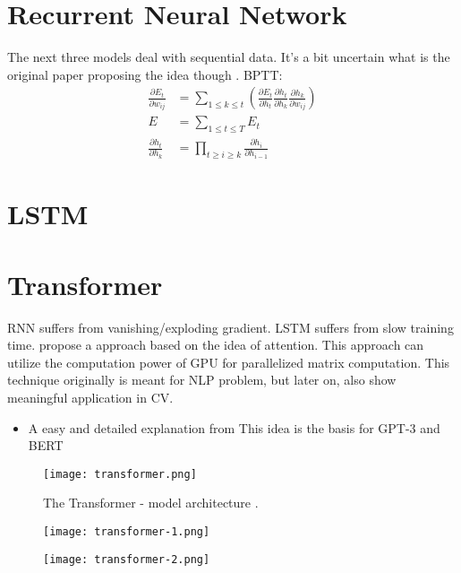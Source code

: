 \section{Recurrent Neural Network}
The next three models deal with sequential data. It's a bit uncertain what is the original paper proposing the idea though \cite{elman1990finding}. \ac{BPTT}:\\
\begin{align}
	\frac{\partial E_t}{\partial w_{ij}} &= \sum_{1 \leq k \leq t} \left( \frac{\partial E_t}{\partial h_t} \frac{\partial h_t}{\partial h_k} \frac{\partial h_k}{\partial w_{ij}} \right)\\
	E &= \sum_{1 \leq t \leq T} E_t\\
	\frac{\partial h_t}{\partial h_k} &= \prod_{t \geq i \geq k} \frac{\partial h_i}{\partial h_{i-1}}
\end{align}

\section{LSTM}
\cite{sutskever2014sequence} \todo{}

\section{Transformer}
\ac{RNN} suffers from vanishing/exploding gradient. \ac{LSTM} suffers from slow training time.  propose a approach based on the idea of attention. This approach can utilize the computation power of \ac{GPU} for parallelized matrix computation. This technique originally is meant for \ac{NLP} problem, but later on, also show meaningful application in \ac{CV}.

\begin{itemize}
	\item A easy and detailed explanation from 
	This idea is the basis for GPT-3 \cite{brown2020language} and BERT \cite{devlin2018bert}
\end{itemize}
\begin{figure}[hbt!]
	\centering
	\texttt{[image: transformer.png]}
	\caption{The Transformer - model architecture \cite{vaswani2017attention}.}
\end{figure}

\begin{figure}[hbt!]
	\centering
	\begin{minipage}{.5\textwidth}
		\centering
		\texttt{[image: transformer-1.png]}
	\end{minipage}%
	\begin{minipage}{.45\textwidth}
		\centering
		\texttt{[image: transformer-2.png]}
	\end{minipage}
\end{figure}

